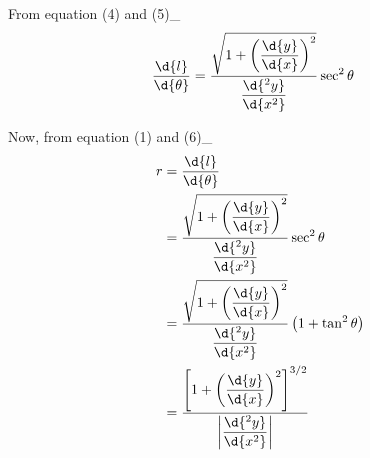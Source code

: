 \documentclass{article}
\begin{document}
From equation (4) and (5)\_
\begin{align}
\dfrac{\d{l}}{\d{\theta}} &= \dfrac{\sqrt{1+ \left( \dfrac{\d{y}}{\d{x}} \right)^2}}{\dfrac{\d{^2y}}{\d{x^2}}} \sec^2\theta
\end{align}
\pagebreak

Now, from equation (1) and (6)\_
\begin{align*}
r &= \dfrac{\d{l}}{\d{\theta}}\\
	&= \dfrac{\sqrt{1+ \left( \dfrac{\d{y}}{\d{x}} \right)^2}}{\dfrac{\d{^2y}}{\d{x^2}}} \sec^2\theta \\
	&= \dfrac{\sqrt{1+ \left( \dfrac{\d{y}}{\d{x}} \right)^2}}{\dfrac{\d{^2y}}{\d{x^2}}} \left( 1 + \tan^2\theta\right) \\
	&=\dfrac{\left[1 + \left(\dfrac{\d{y}}{\d{x}}\right)^2 \right]^{3/2}}{\left| \dfrac{\d{^2y}}{\d{x^2}} \right|}
\end{align*}

\vspace*{\fill}
\pagebreak

\vspace*{\fill}
\begin{center}
	\fbox{\qrcode[height=2cm]{\gdrive}}
\end{center}
\vspace*{\fill}
\end{document}
